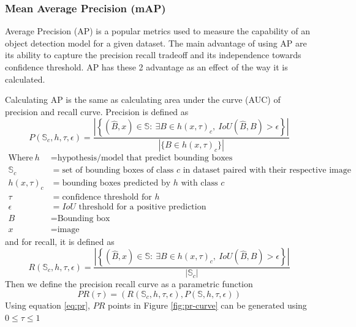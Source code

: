   \subsubsection{Mean Average Precision (mAP)}
  Average Precision (AP) is a popular metrics used to measure the capability of an object detection model
  for a given dataset. The main advantage of using AP are its ability to capture the precision recall
  tradeoff and its independence towards confidence threshold. AP has these 2 advantage as an effect of the way 
  it is calculated.

  Calculating AP is the same as calculating area under the curve (AUC) of precision and recall curve.
  Precision is defined as
  \begin{equation}
    P(\mathbb{S}_c,h,\tau,\epsilon) = \dfrac{\left|\left\{(\hat{B},x) \in \mathbb{S} :\ \exists B \in h(x,\tau)_c,\ IoU(\hat{B},B) > \epsilon  \right\}\right|}{\left| \{B \in h(x,\tau)_c\} \right|}
    \label{eq:precision}
  \end{equation}
  \begin{align*}
    \text{Where}~ h &=  \text{hypothesis/model that predict bounding boxes}\\%
    \mathbb{S}_c &= \text{set of bounding boxes of class $c$ in dataset paired with their respective image}\\
    h(x,\tau)_c &= \text{bounding boxes predicted by $h$ with class $c$}\\
    \tau &= \text{confidence threshold for $h$} \\
    \epsilon &= \text{$IoU$ threshold for a positive prediction}\\
    B &= \text{Bounding box}\\
    x &= \text{image}
  \end{align*}
  and for recall, it is defined as
  \begin{equation}
    R(\mathbb{S}_c,h,\tau,\epsilon) = \dfrac{\left|\left\{(\hat{B},x) \in \mathbb{S} :\ \exists B \in h(x,\tau)_c,\ IoU(\hat{B},B) > \epsilon  \right\}\right|}{\left| \mathbb{S}_c \right|}
    \label{eq:recall}
  \end{equation}
  Then we define the precision recall curve as a parametric function
  \begin{equation}
    PR(\tau) = \left( R(\mathbb{S}_c,h,\tau,\epsilon),P(\mathbb{S},h,\tau,\epsilon) \right)
    \label{eq:pr}
  \end{equation}
  Using equation \ref{eq:pr}, $PR$ points in Figure \ref{fig:pr-curve} can be generated using $0 \leq \tau \leq 1$
